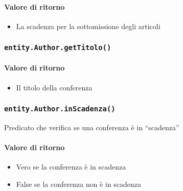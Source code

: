\paragraph{Valore di ritorno}
\begin{itemize}
\item La scadenza per la sottomissione degli articoli
\end{itemize}
\subsubsection{\texttt{entity.Author.getTitolo()}}
\paragraph{Valore di ritorno}
\begin{itemize}
\item Il titolo della conferenza
\end{itemize}
\subsubsection{\texttt{entity.Author.inScadenza()}}
Predicato che verifica se una conferenza è in ``scadenza''
\paragraph{Valore di ritorno}
\begin{itemize}
\item Vero se la conferenza è in scadenza
\item False se la conferenza non  è in scadenza
\end{itemize}


